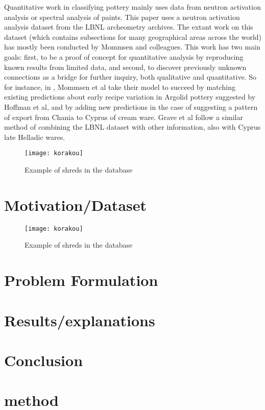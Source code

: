 \documentclass[10pt,a4paper]{article}
\begin{document}
Quantitative work in classifying pottery mainly uses data from neutron activation analysis or spectral analysis of paints.  This paper uses a neutron activation analysis dataset from the LBNL archeometry archives. The extant work on this dataset (which contains subsections for many geographical areas across the world) has mostly been conducted by Mommsen and colleagues. This work has two main goals: first, to be a proof of concept for quantitative analysis by reproducing known results from limited data, and second, to discover previously unknown connections as a bridge for further inquiry, both qualitative and quantitative.  So for instance, in \cite{mommsen2002complete}, Mommsen et al take their model to succeed by matching existing predictions about early recipe variation in Argolid pottery suggested by Hoffman et al, and by adding new predictions in the case of suggesting a pattern of export from Chania to Cyprus of cream ware.  Grave  et al\cite{grave2014ceramics} follow a similar method of combining the LBNL dataset with other information, also with Cyprus late Helladic wares. 


\begin{figure}
\texttt{[image: korakou]}
\caption{Example of shreds in the database}
\label{fig:sample}
\end{figure}






\section{Motivation/Dataset}


\begin{figure}
\texttt{[image: korakou]}
\caption{Example of shreds in the database}
\label{fig:sample}
\end{figure}

\section{Problem Formulation}






\section{Results/explanations}

\section{Conclusion}












\section{method}

\printbibliography
\end{document}
